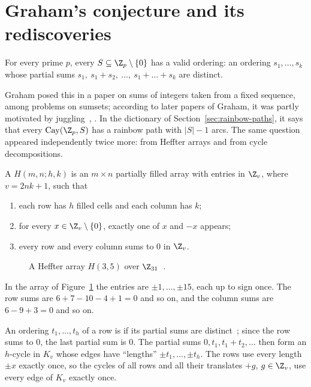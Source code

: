 \section{Graham's conjecture and its rediscoveries}\label{sec:graham}

\begin{conjecture}\label{conj:graham}
For every prime $p$, every $S\subseteq\Z_p\setminus\{0\}$ has a valid ordering: an ordering $s_1,\dots,s_k$ whose partial sums $s_1,\ s_1+s_2,\ \dots,\ s_1+\dots+s_k$ are distinct.
\end{conjecture}

Graham posed this in a paper on sums of integers taken from a fixed sequence, among problems on sumsets; according to later papers of Graham, it was partly motivated by juggling~\cite[\S1]{bfmpy25}, \cite{begw94}. In the dictionary of Section~\ref{sec:rainbow-paths}, it says that every $\operatorname{Cay}(\Z_p,S)$ has a rainbow path with $|S|-1$ arcs. The same question appeared independently twice more: from Heffter arrays and from cycle decompositions.


\begin{definition}\label{def:heffter}
A  $H(m,n;h,k)$ is an $m\times n$ partially filled array with entries in $\Z_v$, where $v=2nk+1$, such that
\begin{enumerate}
\item each row has $h$ filled cells and each column has $k$;
\item for every $x\in\Z_v\setminus\{0\}$, exactly one of $x$ and $-x$ appears;
\item every row and every column sums to $0$ in $\Z_v$.
\end{enumerate}
\end{definition}

\begin{figure}[ht]
\centering

\caption{A Heffter array $H(3,5)$ over $\Z_{31}$~\cite[Example~1.3]{pd22}.}
\label{fig:heffter}
\end{figure}

In the array of Figure~\ref{fig:heffter} the entries are $\pm1,\dots,\pm15$, each up to sign once. The row sums are $6+7-10-4+1=0$ and so on, and the column sums are $6-9+3=0$ and so on.

An ordering $t_1,\dots,t_h$ of a row is  if its partial sums are distinct~\cite[\S2]{pd22}; since the row sums to $0$, the last partial sum is $0$. The partial sums $0,t_1,t_1+t_2,\dots$ then form an $h$-cycle in $K_v$ whose edges have ``lengths'' $\pm t_1,\dots,\pm t_h$. The rows use every length $\pm x$ exactly once, so the cycles of all rows and all their translates $+g$, $g\in\Z_v$, use every edge of $K_v$ exactly once.

